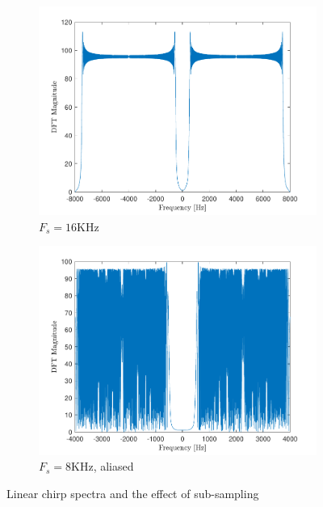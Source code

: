 \documentclass[10pt]{article}
\begin{document}
\begin{figure}[ht]
    \centering
    \begin{subfigure}[b]{0.48\textwidth}
        \includegraphics[width=\textwidth]{problem8_fft_linear_chirp.pdf}
        \caption{$F_s = 16$KHz}
    \end{subfigure}
    \quad
    \begin{subfigure}[b]{0.48\textwidth}
        \includegraphics[width=\textwidth]{problem8_fft_subsampled_linear_chirp.pdf}
        \caption{$F_s = 8$KHz, aliased}
    \end{subfigure}
    \caption{Linear chirp spectra and the effect of sub-sampling\vspace{-0.5cm}}
    \label{linear_chirp_fft}
\end{figure}
\end{document}
